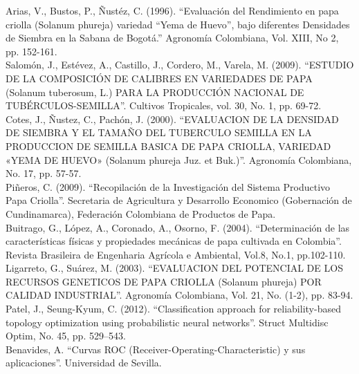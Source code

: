 \noindent
Arias, V., Bustos, P., Ñustéz, C. (1996). "`Evaluación del Rendimiento en papa criolla (Solanum phureja) variedad "`Yema de Huevo"', bajo diferentes Densidades de Siembra en la Sabana de Bogotá."' Agronomía Colombiana, Vol. XIII, No 2, pp. 152-161.\\

\noindent
Salomón, J., Estévez, A., Castillo, J., Cordero, M., Varela, M. (2009). "`ESTUDIO DE LA COMPOSICIÓN DE CALIBRES EN VARIEDADES DE PAPA (Solanum tuberosum, L.) PARA LA PRODUCCIÓN NACIONAL DE TUBÉRCULOS-SEMILLA"'.
Cultivos Tropicales, vol. 30, No. 1, pp. 69-72.\\

\noindent
Cotes, J., Ñustez, C., Pachón, J. (2000). "`EVALUACION DE LA DENSIDAD DE SIEMBRA Y EL TAMAÑO DEL TUBERCULO SEMILLA EN LA PRODUCCION DE SEMILLA BASICA DE PAPA CRIOLLA, VARIEDAD «YEMA DE HUEVO» (Solanum phureja Juz. et Buk.)"'. Agronomía Colombiana, No. 17, pp. 57-57.\\

\noindent 
Piñeros, C. (2009). "`Recopilación de la Investigación del Sistema Productivo Papa Criolla"'. Secretaria de Agricultura y Desarrollo Economico (Gobernación de Cundinamarca), Federación Colombiana de Productos de Papa.\\

\noindent
Buitrago, G., López, A., Coronado, A., Osorno, F. (2004). "`Determinación de las características físicas y propiedades mecánicas de papa cultivada en Colombia"'. Revista Brasileira de Engenharia Agrícola e Ambiental, Vol.8, No.1, pp.102-110.\\

\noindent
Ligarreto, G., Suárez, M. (2003). "`EVALUACION DEL POTENCIAL DE LOS RECURSOS GENETICOS DE PAPA CRIOLLA (Solanum phureja) POR CALIDAD INDUSTRIAL"'. Agronomía Colombiana, Vol. 21, No. (1-2), pp. 83-94.\\

\noindent 
Patel, J., Seung-Kyum, C. (2012). "`Classification approach for reliability-based topology optimization using probabilistic neural networks"'. Struct Multidisc Optim, No. 45, pp. 529–543.\\

\noindent
Benavides, A. "`Curvas ROC (Receiver-Operating-Characteristic) y sus aplicaciones"'. Universidad de Sevilla.




 